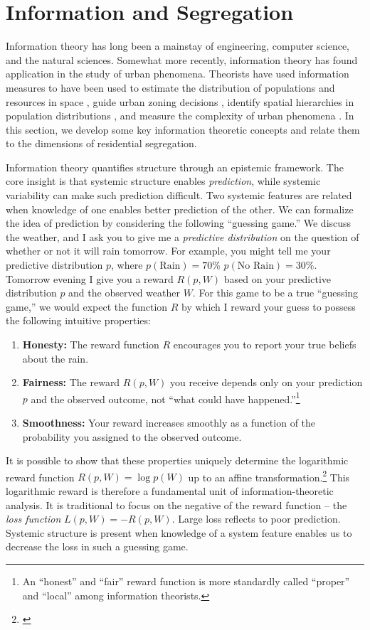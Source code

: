 \documentclass[english]{scrartcl}
\begin{document}
\section{Information and Segregation} \label{sec:information}
	Information theory has long been a mainstay of engineering, computer science, and the natural sciences. Somewhat more recently, information theory has found application in the study of urban phenomena. Theorists have used information measures to have been used to estimate the distribution of populations and resources in space \cite{Webber1979}, guide urban zoning decisions \cite{Batty1972}, identify spatial hierarchies in population distributions \cite{Batty1974,Batty1976}, and measure the complexity of urban phenomena \cite{Bettencourt2015,Batty2014a}. In this section, we develop some key information theoretic concepts and relate them to the dimensions of residential segregation.

	Information theory quantifies structure through an epistemic framework. The core insight is that systemic structure enables \emph{prediction}, while systemic variability can make such prediction difficult. Two systemic features are related when knowledge of one enables better prediction of the other. We can formalize the idea of prediction by considering the following ``guessing game.'' We discuss the weather, and I ask you to give me a \emph{predictive distribution} on the question of whether or not it will rain tomorrow. For example, you might tell me your predictive distribution $p$, where $p(\text{Rain}) = 70\%$ $p(\text{No Rain}) = 30\%$. Tomorrow evening I give you a reward $R(p,W)$ based on your predictive distribution $p$ and the observed weather $W$. For this game to be a true ``guessing game,'' we would expect the function $R$ by which I reward your guess to possess the following intuitive properties: 
	\begin{enumerate}
		\item \textbf{Honesty:} The reward function $R$ encourages you to report your true beliefs about the rain.
		\item \textbf{Fairness:} The reward $R(p,W)$ you receive depends only on your prediction $p$ and the observed outcome, not ``what could have happened.''\footnote{An ``honest'' and ``fair'' reward function is more standardly called ``proper'' and ``local'' among information theorists. 
		}
		\item \textbf{Smoothness:} Your reward increases smoothly as a function of the probability you assigned to the observed outcome. 
	\end{enumerate}
	It is possible to show that these properties uniquely determine the logarithmic reward function $R(p,W) = \log p(W)$ up to an affine transformation.\footnote{\cite{Cover1991,Csiszzr2004}} This logarithmic reward is therefore a fundamental unit of information-theoretic analysis. It is traditional to focus on the negative of the reward function -- the \emph{loss function} $L(p,W) = - R(p,W)$. Large loss reflects to poor prediction. Systemic structure is present when knowledge of a system feature enables us to decrease the loss in such a guessing game. 
\end{document}
